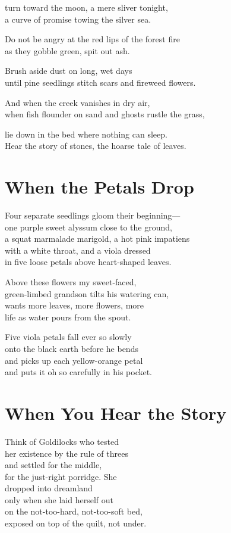 \documentclass[twoside,10pt]{book}
\begin{document}
turn toward the moon, a mere sliver tonight,\\
a curve of promise towing the silver sea.

Do not be angry at the red lips of the forest fire\\
as they gobble green, spit out ash.

Brush aside dust on long, wet days\\
until pine seedlings stitch scars and fireweed flowers.

And when the creek vanishes in dry air,\\
when fish flounder on sand and ghosts rustle the grass,

lie down in the bed where nothing can sleep.\\
Hear the story of stones, the hoarse tale of leaves.


\clearpage
\section{When the Petals Drop}

Four separate seedlings gloom their beginning---\\
one purple sweet alyssum close to the ground,\\
a squat marmalade marigold, a hot pink impatiens\\
with a white throat, and a viola dressed\\
in five loose petals above heart-shaped leaves.

Above these flowers my sweet-faced,\\
green-limbed grandson tilts his watering can,\\
wants more leaves, more flowers, more\\
life as water pours from the spout.

Five viola petals fall ever so slowly\\
onto the black earth before he bends\\
and picks up each yellow-orange petal\\
and puts it oh so carefully in his pocket.


\clearpage
\section{When You Hear the Story}

Think of Goldilocks who tested\\
her existence by the rule of threes\\
and settled for the middle,\\
for the just-right porridge. She\\
dropped into dreamland\\
only when she laid herself out\\
on the not-too-hard, not-too-soft bed,\\
exposed on top of the quilt, not under.
\end{document}
